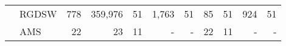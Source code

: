 \begin{table}[H]
\begin{tabular}{llrrrrrrrrr}
\cline{2-11}
\bfseries  & RGDSW & 778 & {\cellcolor[HTML]{E2E4FB}} \color[HTML]{000000} 359,976 & 51 & {\cellcolor[HTML]{ACB8F4}} \color[HTML]{000000} 1,763 & 51 & {\cellcolor[HTML]{768BEC}} \color[HTML]{F1F1F1} 85 & 51 & {\cellcolor[HTML]{405FE5}} \color[HTML]{F1F1F1} 924 & 51 \\
\cline{2-11}
\bfseries  & AMS & 22 & {\cellcolor[HTML]{768BEC}} \color[HTML]{F1F1F1} 23 & 11 & {\cellcolor[HTML]{ACB8F4}} \color[HTML]{000000} {\cellcolor[HTML]{E2E4FB}} - & - & {\cellcolor[HTML]{405FE5}} \color[HTML]{F1F1F1} 22 & 11 & {\cellcolor[HTML]{E2E4FB}} \color[HTML]{000000} {\cellcolor[HTML]{E2E4FB}} - & - \\
\cline{1-11} \cline{2-11}
\bottomrule
\end{tabular}
\end{table}
